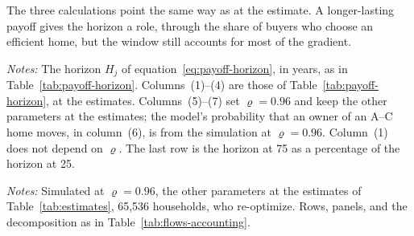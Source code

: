 The three calculations point the same way as at the estimate. A
longer-lasting payoff gives the horizon a role, through the share of buyers
who choose an efficient home, but the window still accounts for most of the
gradient.

\begin{table}[htbp]
  \centering
  \caption[The payoff horizon when efficiency lasts longer]{The
  payoff horizon when efficiency lasts longer}\label{tab:payoff-horizon-varrho}
  \begin{threeparttable}
    \small
    \begin{tablenotes}[flushleft]\footnotesize
      \item \textit{Notes:} The horizon $H_j$ of
      equation~\eqref{eq:payoff-horizon}, in years, as in
      Table~\ref{tab:payoff-horizon}. Columns~(1)--(4) are those of
      Table~\ref{tab:payoff-horizon}, at the estimates. Columns~(5)--(7) set
      $\varrho=0.96$ and keep the other parameters at the estimates; the
      model's probability that an owner of an A--C home moves, in
      column~(6), is from the simulation at $\varrho=0.96$. Column~(1) does
      not depend on $\varrho$. The last row is the horizon at 75 as a
      percentage of the horizon at 25.
    \end{tablenotes}
  \end{threeparttable}
\end{table}

\begin{table}[htbp]
  \centering
  \caption[Flows into and out of efficient ownership when efficiency lasts
  longer]{Flows into and out of efficient ownership when efficiency
  lasts longer}\label{tab:flows-accounting-varrho}
  \begin{threeparttable}
    \small
    \begin{tablenotes}[flushleft]\footnotesize
      \item \textit{Notes:} Simulated at $\varrho=0.96$, the other
      parameters at the estimates of Table~\ref{tab:estimates}, 65,536
      households, who re-optimize. Rows, panels, and the decomposition as in
      Table~\ref{tab:flows-accounting}.
    \end{tablenotes}
  \end{threeparttable}
\end{table}

